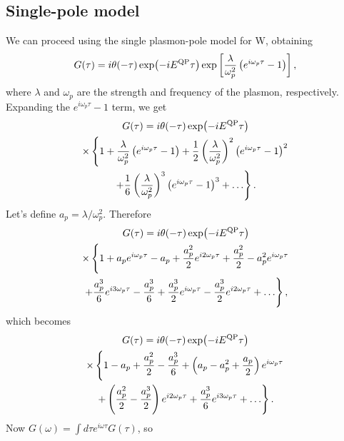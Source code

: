 \documentclass[a4paper,12pt]{article}
\def\be{\begin{equation}}
\def\ee{\end{equation}}
\begin{document}
\subsection{Single-pole model}
We can proceed using the single plasmon-pole model for W, obtaining
\be
   {G} ( \tau ) =  i \theta ( -\tau ) 
  \exp\! \left( - i E^\textnormal{QP} \tau \right)
  \exp\left[ 
   \frac{\lambda}{\omega_p^2} \left( 
   e^{i\omega_p \tau } - 1 
      \right)  \right] ,
\ee
where $\lambda$ and $\omega_p$ are the strength and frequency of the plasmon, respectively. 
Expanding the  $e^{ i \omega_p \tau } - 1 $ term, we get
\begin{multline}
   {G} ( \tau ) =  i \theta ( -\tau ) 
  \exp\! \left( - i E^\textnormal{QP} \tau \right) \\
 \times \left\{ 1 + 
   \frac{\lambda}{\omega_p^2} \left(  e^{i\omega_p \tau } - 1 \right) 
  + \frac12 \left( \frac{\lambda}{\omega_p^2} \right)^2  \left( e^{i\omega_p \tau } - 1 \right)^2  \right. \\
  \left.  + \frac16 \left( \frac{\lambda}{\omega_p^2} \right)^3  \left( e^{i\omega_p \tau } - 1 \right)^3  
  + \ldots  \right\} .
\end{multline}
Let's define $a_p=\lambda/\omega_p^2$. Therefore
\begin{multline}
   {G} ( \tau ) =  i \theta ( -\tau ) 
  \exp\! \left( - i E^\textnormal{QP} \tau \right) \\
 \times \left\{ 1 + 
   a_p e^{i\omega_p \tau } - a_p 
  + \frac{a_p^2}2  e^{i 2\omega_p \tau }  + \frac{a_p^2}2 - a_p^2 e^{i \omega_p \tau }  \right. \\
  \left.  + \frac{a_p^3}6 e^{ i 3 \omega_p \tau } - \frac{a_p^3}6 
  + \frac{a_p^3}2 e^{ i \omega_p \tau } -  \frac{a_p^3}2 e^{ i 2 \omega_p \tau }
  + \ldots  \right\} ,
\end{multline}
which becomes
\begin{multline}
   {G} ( \tau ) =  i \theta ( -\tau ) 
  \exp\! \left( - i E^\textnormal{QP} \tau \right) \\
 \times \left\{ 1 - a_p +\frac{a_p^2}2 -\frac{a_p^3}6 
   + \left( a_p - a_p^2 +\frac{a_p}2 \right) e^{i\omega_p \tau }   \right. \\
  \left.  + \left( \frac{a_p^2}2 - \frac{a_p^3}2 \right) e^{i 2 \omega_p \tau }
  + \frac{a_p^3}6 e^{ i 3 \omega_p \tau } 
  + \ldots  \right\} .
\end{multline}
%
Now $G(\omega) = \int\!d\tau e^{i\omega\tau} G(\tau)$, so
\end{document}
